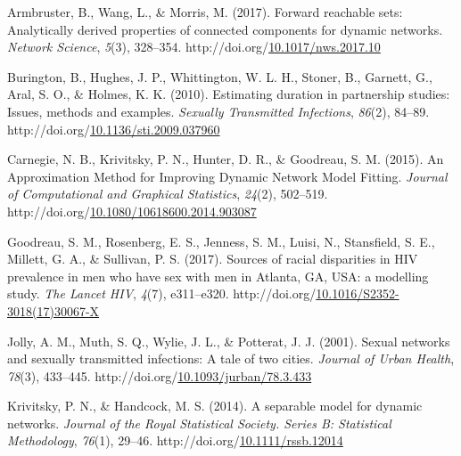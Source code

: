 \documentclass [11pt, proquest] {uwthesis}[2015/03/03]
\newlength{\cslhangindent}
\newenvironment{CSLReferences}%
{\setlength{\parindent}{0pt}%
\everypar{\setlength{\hangindent}{\cslhangindent}}\ignorespaces}%
{\par}
\begin{document}

\noindent

\setlength{\parindent}{-0.20in}
\setlength{\leftskip}{0.20in}
\setlength{\parskip}{8pt}

\hypertarget{refs}{}
\begin{CSLReferences}{1}{0}
\leavevmode\hypertarget{ref-Armbruster2017}{}%
Armbruster, B., Wang, L., \& Morris, M. (2017). {Forward reachable sets: Analytically derived properties of connected components for dynamic networks}. \emph{Network Science}, \emph{5}(3), 328--354. http://doi.org/\href{https://doi.org/10.1017/nws.2017.10}{10.1017/nws.2017.10}

\leavevmode\hypertarget{ref-Burington2010}{}%
Burington, B., Hughes, J. P., Whittington, W. L. H., Stoner, B., Garnett, G., Aral, S. O., \& Holmes, K. K. (2010). {Estimating duration in partnership studies: Issues, methods and examples}. \emph{Sexually Transmitted Infections}, \emph{86}(2), 84--89. http://doi.org/\href{https://doi.org/10.1136/sti.2009.037960}{10.1136/sti.2009.037960}

\leavevmode\hypertarget{ref-Carnegie2015}{}%
Carnegie, N. B., Krivitsky, P. N., Hunter, D. R., \& Goodreau, S. M. (2015). {An Approximation Method for Improving Dynamic Network Model Fitting}. \emph{Journal of Computational and Graphical Statistics}, \emph{24}(2), 502--519. http://doi.org/\href{https://doi.org/10.1080/10618600.2014.903087}{10.1080/10618600.2014.903087}

\leavevmode\hypertarget{ref-Goodreau2017}{}%
Goodreau, S. M., Rosenberg, E. S., Jenness, S. M., Luisi, N., Stansfield, S. E., Millett, G. A., \& Sullivan, P. S. (2017). {Sources of racial disparities in HIV prevalence in men who have sex with men in Atlanta, GA, USA: a modelling study}. \emph{The Lancet HIV}, \emph{4}(7), e311--e320. http://doi.org/\href{https://doi.org/10.1016/S2352-3018(17)30067-X}{10.1016/S2352-3018(17)30067-X}

\leavevmode\hypertarget{ref-Jolly2001}{}%
Jolly, A. M., Muth, S. Q., Wylie, J. L., \& Potterat, J. J. (2001). {Sexual networks and sexually transmitted infections: A tale of two cities}. \emph{Journal of Urban Health}, \emph{78}(3), 433--445. http://doi.org/\href{https://doi.org/10.1093/jurban/78.3.433}{10.1093/jurban/78.3.433}

\leavevmode\hypertarget{ref-Krivitsky2014}{}%
Krivitsky, P. N., \& Handcock, M. S. (2014). {A separable model for dynamic networks}. \emph{Journal of the Royal Statistical Society. Series B: Statistical Methodology}, \emph{76}(1), 29--46. http://doi.org/\href{https://doi.org/10.1111/rssb.12014}{10.1111/rssb.12014}


\end{CSLReferences}
\end{document}

